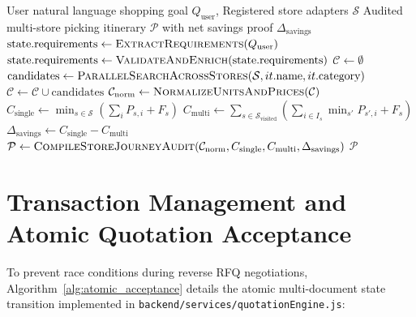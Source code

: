 \begin{algorithm}[H]
\caption{Autonomous Multi-Store LangGraph Decision Pipeline}
\label{alg:langgraph_pipeline}
\begin{algorithmic}[1]
\Require User natural language shopping goal $Q_{\text{user}}$, Registered store adapters $\mathcal{S}$
\Ensure Audited multi-store picking itinerary $\mathcal{P}$ with net savings proof $\Delta_{\text{savings}}$
\State $\text{state}.\text{requirements} \gets \textsc{ExtractRequirements}(Q_{\text{user}})$ 
\State $\text{state}.\text{requirements} \gets \textsc{ValidateAndEnrich}(\text{state}.\text{requirements})$ 
\State $\mathcal{C} \gets \emptyset$
 
    \State $\text{candidates} \gets \textsc{ParallelSearchAcrossStores}(\mathcal{S}, it.\text{name}, it.\text{category})$
    \State $\mathcal{C} \gets \mathcal{C} \cup \text{candidates}$
\EndFor
\State $\mathcal{C}_{\text{norm}} \gets \textsc{NormalizeUnitsAndPrices}(\mathcal{C})$ 
\State $C_{\text{single}} \gets \min_{s \in \mathcal{S}} \left( \sum_{i} P_{s, i} + F_s \right)$ 
\State $C_{\text{multi}} \gets \sum_{s \in \mathcal{S}_{\text{visited}}} \left( \sum_{i \in I_s} \min_{s'} P_{s', i} + F_s \right)$ 
\State $\Delta_{\text{savings}} \gets C_{\text{single}} - C_{\text{multi}}$
\State $\mathcal{P} \gets \textsc{CompileStoreJourneyAudit}(\mathcal{C}_{\text{norm}}, C_{\text{single}}, C_{\text{multi}}, \Delta_{\text{savings}})$ 
\State \Return $\mathcal{P}$
\end{algorithmic}
\end{algorithm}

\section{Transaction Management and Atomic Quotation Acceptance}

To prevent race conditions during reverse RFQ negotiations, Algorithm~\ref{alg:atomic_acceptance} details the atomic multi-document state transition implemented in \texttt{backend/services/quotationEngine.js}:

